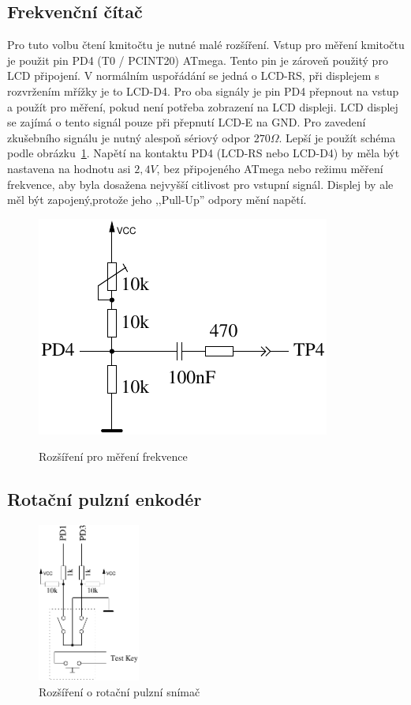 \subsection{Frekvenční čítač}
\label{sec:frequency_counter}

Pro tuto volbu čtení kmitočtu je nutné malé rozšíření.
Vstup pro měření kmitočtu je použit pin PD4 (T0 / PCINT20) ATmega. Tento pin je zároveň použitý
pro LCD připojení.
V normálním uspořádání se jedná o LCD-RS, při displejem s rozvržením mřížky je to LCD-D4.
Pro oba signály je pin PD4 přepnout na vstup a použít pro měření,
pokud není potřeba zobrazení na LCD displeji.
LCD displej se zajímá  o tento signál pouze při přepnutí LCD-E na GND.
Pro zavedení zkušebního signálu je nutný alespoň sériový odpor \(270\Omega\).
Lepší je použít schéma podle obrázku~\ref{fig:FreqMes}.
Napětí na kontaktu PD4 (LCD-RS nebo LCD-D4) by měla být nastavena na hodnotu asi \(2,4V\),
bez připojeného ATmega nebo režimu měření frekvence,
aby byla dosažena nejvyšší citlivost pro vstupní signál.
Displej by ale měl být zapojený,protože jeho ,,Pull-Up'' odpory mění napětí.

\begin{figure}[H]
\centering
\includegraphics[width=.4\textwidth]{../FIG/Frequency_addon.pdf}
\
\caption{Rozšíření pro měření frekvence}
\label{fig:FreqMes}
\end{figure}
 
\subsection{Rotační pulzní enkodér}
 
\begin{figure}
\vspace{-1.5\baselineskip}
\begin{center}
\includegraphics[width=0.30\textwidth]{../FIG/rotary_extension.pdf}
\end{center}
\vspace{-0.5\baselineskip}
\caption{Rozšíření o rotační pulzní snímač}
\vspace{-0.5\baselineskip}
\label{fig:RotExt}
\end{figure}



